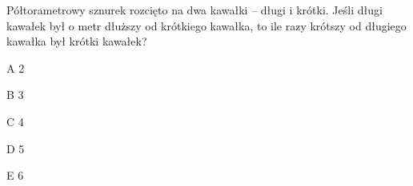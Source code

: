 \begin{tresc}
Półtorametrowy sznurek rozcięto na dwa kawałki – długi i krótki. Jeśli długi kawałek był o metr dłuższy od krótkiego kawałka, to ile razy krótszy od długiego kawałka był krótki kawałek?
\end{tresc}
\begin{wariant}{A} 2 \end{wariant}
\begin{wariant}{B} 3 \end{wariant}
\begin{wariant}{C} 4 \end{wariant}
\begin{wariant}{D} 5 \end{wariant}
\begin{wariant}{E} 6 \end{wariant}

